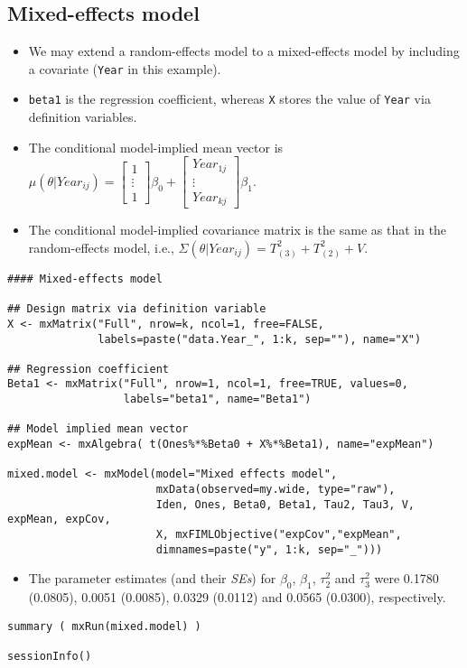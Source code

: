 \documentclass[11pt]{article}
\begin{document}
\subsection{Mixed-effects model}
\label{sec:orgf47a922}
\begin{itemize}
\item We may extend a random-effects model to a mixed-effects model by including a covariate (\texttt{Year} in this example).
\item \texttt{beta1} is the regression coefficient, whereas \texttt{X} stores the value of \texttt{Year} via definition variables.
\item The conditional model-implied mean vector is \(\mu(\theta|Year_{ij}) = \left[ \begin{array}{c} 1 \\ \vdots \\ 1 \end{array} \right]\beta_0 + \left[ \begin{array}{c} Year_{1j} \\ \vdots \\ Year_{kj} \end{array} \right]\beta_1\).
\item The conditional model-implied covariance matrix is the same as that in the random-effects model, i.e., \(\Sigma(\theta|Year_{ij}) = T^2_{(3)} + T^2_{(2)} + V\).
\end{itemize}
\begin{verbatim}
#### Mixed-effects model

## Design matrix via definition variable
X <- mxMatrix("Full", nrow=k, ncol=1, free=FALSE, 
              labels=paste("data.Year_", 1:k, sep=""), name="X")

## Regression coefficient
Beta1 <- mxMatrix("Full", nrow=1, ncol=1, free=TRUE, values=0,
                  labels="beta1", name="Beta1")

## Model implied mean vector
expMean <- mxAlgebra( t(Ones%*%Beta0 + X%*%Beta1), name="expMean")

mixed.model <- mxModel(model="Mixed effects model", 
                       mxData(observed=my.wide, type="raw"), 
                       Iden, Ones, Beta0, Beta1, Tau2, Tau3, V, expMean, expCov, 
                       X, mxFIMLObjective("expCov","expMean", 
                       dimnames=paste("y", 1:k, sep="_")))
\end{verbatim}

\begin{itemize}
\item The parameter estimates (and their \emph{SEs}) for \(\beta_0\), \(\beta_1\), \(\tau^2_2\) and \(\tau^2_3\) were 0.1780 (0.0805), 0.0051 (0.0085), 0.0329 (0.0112) and 0.0565 (0.0300), respectively.
\end{itemize}
\begin{verbatim}
summary ( mxRun(mixed.model) )

sessionInfo()
\end{verbatim}
\end{document}
